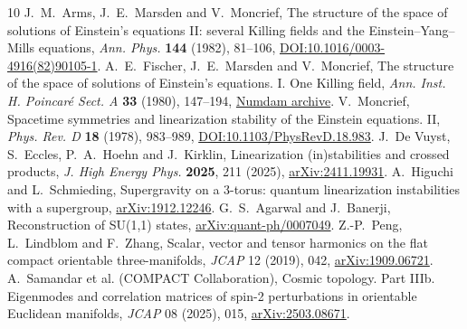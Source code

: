 \begin{thebibliography}{10}
J.~M.~Arms, J.~E.~Marsden and V.~Moncrief,
The structure of the space of solutions of Einstein's equations II: several Killing fields and the Einstein--Yang--Mills equations,
\emph{Ann. Phys.} \textbf{144} (1982), 81--106,
\href{https://doi.org/10.1016/0003-4916(82)90105-1}{DOI:10.1016/0003-4916(82)90105-1}.
A.~E.~Fischer, J.~E.~Marsden and V.~Moncrief,
The structure of the space of solutions of Einstein's equations. I. One Killing field,
\emph{Ann. Inst. H. Poincar\'e Sect. A} \textbf{33} (1980), 147--194,
\href{https://www.numdam.org/item/AIHPA_1980__33_2_147_0/}{Numdam archive}.
V.~Moncrief, Spacetime symmetries and linearization stability of the Einstein equations. II,
\emph{Phys. Rev. D} \textbf{18} (1978), 983--989,
\href{https://doi.org/10.1103/PhysRevD.18.983}{DOI:10.1103/PhysRevD.18.983}.
J.~De Vuyst, S.~Eccles, P.~A.~Hoehn and J.~Kirklin,
Linearization (in)stabilities and crossed products,
\emph{J. High Energy Phys.} \textbf{2025}, 211 (2025),
\href{https://arxiv.org/abs/2411.19931}{arXiv:2411.19931}.
A.~Higuchi and L.~Schmieding,
Supergravity on a 3-torus: quantum linearization instabilities with a supergroup,
\href{https://arxiv.org/abs/1912.12246}{arXiv:1912.12246}.
G.~S.~Agarwal and J.~Banerji, Reconstruction of SU(1,1) states,
\href{https://arxiv.org/abs/quant-ph/0007049}{arXiv:quant-ph/0007049}.
Z.-P.~Peng, L.~Lindblom and F.~Zhang,
Scalar, vector and tensor harmonics on the flat compact orientable three-manifolds,
\emph{JCAP} 12 (2019), 042,
\href{https://arxiv.org/abs/1909.06721}{arXiv:1909.06721}.
A.~Samandar et al. (COMPACT Collaboration),
Cosmic topology. Part IIIb. Eigenmodes and correlation matrices of spin-2 perturbations in orientable Euclidean manifolds,
\emph{JCAP} 08 (2025), 015,
\href{https://arxiv.org/abs/2503.08671}{arXiv:2503.08671}.
\end{thebibliography}

